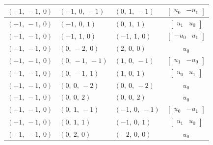 \documentclass[11pt]{article}
\theoremstyle{definition}
\begin{document}
\begin{longtable}{|l|l|l|c|}
    \hline
    $\left( -1, \  -1, \  0\right)$ & $\left( -1, \  0, \  -1\right)$ & $\left( 0, \  1, \  -1\right)$ & $\left[\begin{matrix}u_{0} & - u_{1}\end{matrix}\right]$ \\
    \hline
    $\left( -1, \  -1, \  0\right)$ & $\left( -1, \  0, \  1\right)$ & $\left( 0, \  1, \  1\right)$ & $\left[\begin{matrix}u_{1} & u_{0}\end{matrix}\right]$ \\
    \hline
    $\left( -1, \  -1, \  0\right)$ & $\left( -1, \  1, \  0\right)$ & $\left( -1, \  1, \  0\right)$ & $\left[\begin{matrix}- u_{0} & u_{1}\end{matrix}\right]$ \\
    \hline
    $\left( -1, \  -1, \  0\right)$ & $\left( 0, \  -2, \  0\right)$ & $\left( 2, \  0, \  0\right)$ & $u_{0}$ \\
    \hline
    $\left( -1, \  -1, \  0\right)$ & $\left( 0, \  -1, \  -1\right)$ & $\left( 1, \  0, \  -1\right)$ & $\left[\begin{matrix}u_{1} & - u_{0}\end{matrix}\right]$ \\
    \hline
    $\left( -1, \  -1, \  0\right)$ & $\left( 0, \  -1, \  1\right)$ & $\left( 1, \  0, \  1\right)$ & $\left[\begin{matrix}u_{0} & u_{1}\end{matrix}\right]$ \\
    \hline
    $\left( -1, \  -1, \  0\right)$ & $\left( 0, \  0, \  -2\right)$ & $\left( 0, \  0, \  -2\right)$ & $u_{0}$ \\
    \hline
    $\left( -1, \  -1, \  0\right)$ & $\left( 0, \  0, \  2\right)$ & $\left( 0, \  0, \  2\right)$ & $u_{0}$ \\
    \hline
    $\left( -1, \  -1, \  0\right)$ & $\left( 0, \  1, \  -1\right)$ & $\left( -1, \  0, \  -1\right)$ & $\left[\begin{matrix}u_{0} & - u_{1}\end{matrix}\right]$ \\
    \hline
    $\left( -1, \  -1, \  0\right)$ & $\left( 0, \  1, \  1\right)$ & $\left( -1, \  0, \  1\right)$ & $\left[\begin{matrix}u_{1} & u_{0}\end{matrix}\right]$ \\
    \hline
    $\left( -1, \  -1, \  0\right)$ & $\left( 0, \  2, \  0\right)$ & $\left( -2, \  0, \  0\right)$ & $u_{0}$ \\

\end{longtable}
\end{document}
